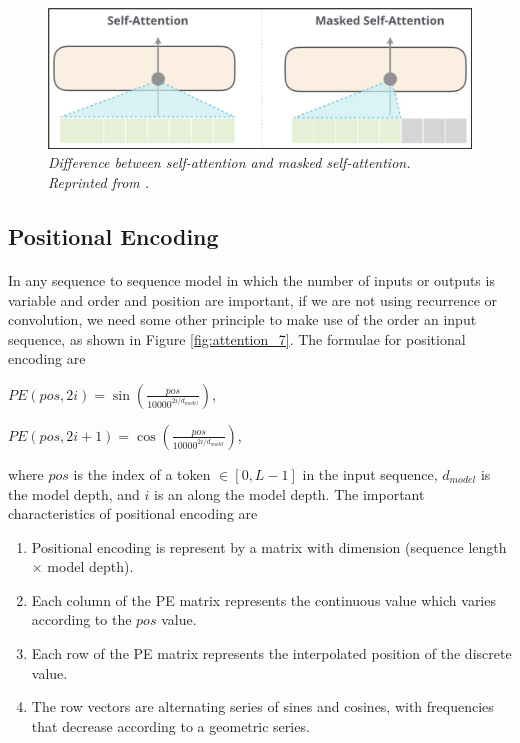 \begin{figure}[H]
  \centering
  \caption[Difference between self-attention and masked self-attention.]{\emph{Difference between self-attention and masked self-attention. \\ Reprinted from \citeauthor{alammar_2019} \citeyear{alammar_2019}.}}\label{fig:attention_6}
  \includegraphics[scale = 0.3]{figures/attention_6.jpg}  
\end{figure}
\subsection{Positional Encoding}

\paragraph{}
In any sequence to sequence model in which the number of inputs or outputs is variable and order and position are important, if we are not using recurrence or convolution, we need some other principle to make use of the order an input sequence, as shown in Figure \ref{fig:attention_7}. The formulae for positional encoding are

\hfil $PE(pos, 2i) = \sin(\frac{pos}{10000^{2i/d_{model}}})$, \par 
\hfil $PE(pos, 2i + 1) = \cos(\frac{pos}{10000^{2i/d_{model}}})$, \par 

where $pos$ is the index of a token $\in[0, L-1]$ in the input sequence, $d_{model}$ is the model depth, and $i$ is an along the model depth. The important characteristics of positional encoding are 

\begin{enumerate}
  \item Positional encoding is represent by a matrix with dimension (sequence length $\times$ model depth).
  \item Each column of the PE matrix represents the continuous value which varies according to the $pos$ value.
  \item Each row of the PE matrix represents the interpolated position of the discrete value.
  \item The row vectors are alternating series of sines and cosines, with frequencies that decrease according to a geometric series.
  \end{enumerate}

